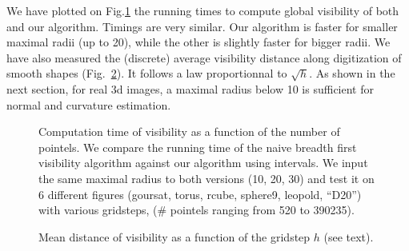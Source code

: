 
We have plotted on Fig.\ref{fig:meanvisibility-computationComplexity}
the running times to compute global visibility of both~\cite[Algorithm
  3]{lachaud:2022-jmiv} and our algorithm. Timings are very
similar. Our algorithm is faster for smaller maximal radii (up to 20),
while the other is slightly faster for bigger radii. We have also
measured the (discrete) average visibility distance along digitization
of smooth shapes (Fig.~\ref{fig:meanvisibility-gridstep}). It follows
a law proportionnal to $\sqrt{h}$. As shown in the next section, for
real 3d images, a maximal radius below 10 is sufficient for normal and
curvature estimation.


\begin{figure}[t]
  \centering
  
  \caption{ \label{fig:meanvisibility-computationComplexity}Computation
    time of visibility as a function of the number of pointels. We
    compare the running time of the naive breadth first visibility
    algorithm against our algorithm using intervals. We input the same
    maximal radius to both versions (10, 20, 30) and test it on 6
    different figures (goursat, torus, rcube, sphere9, leopold,
    ``D20'') with various gridsteps, ($\#$ pointels ranging from 520
    to 390235).}
\end{figure}

\begin{figure}
  \centering
  
  \caption{\label{fig:meanvisibility-gridstep} Mean distance of visibility as a function of the gridstep $h$ (see text).}
\end{figure}
